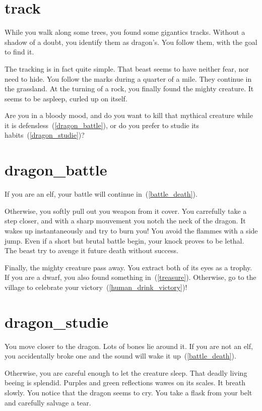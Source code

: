 \section{track}

While you walk along some trees, you found some gigantics tracks. Without a
shadow of a doubt, you identify them as dragon's. You follow them, with
the goal to find it.

The tracking is in fact quite simple. That beast seems to have neither fear, nor
need to hide. You follow the marks during a quarter of a mile. They continue in
the grassland. At the turning of a rock, you finally found the mighty creature.
It seems to be aspleep, curled up on itself.

Are you in a bloody mood, and do you want to kill that mythical creature while it
is defensless~(\ref{dragon_battle}), or do you prefer to studie its
habits~(\ref{dragon_studie})?

\section{dragon_battle}

If you are an elf, your battle will continue in~(\ref{battle_death}).

\medbreak

Otherwise, you softly pull out you weapon from it cover. You carrefully take a
step closer, and with a sharp mouvement you notch the neck of the dragon. It wakes
up instantaneously and try to burn you! You avoid the flammes with a side jump.
Even if a short but brutal battle begin, your knock proves to be lethal. The
beast try to avenge it future death without success.

Finally, the mighty creature pass away. You extract both of its eyes as a
trophy. If you are a dwarf, you also found something in~(\ref{treasure}).
Otherwise, go to the village to celebrate your
victory~(\ref{human_drink_victory})!

\section{dragon_studie}

You move closer to the dragon. Lots of bones lie around it. If you are not an
elf, you accidentally broke one and the sound will wake it
up~(\ref{battle_death}).

\medbreak

Otherwise, you are careful enough to let the creature sleep. That deadly living
beeing is splendid. Purples and green reflections wawes on its scales. It breath
slowly. You notice that the dragon seems to cry. You take a flask from your belt
and carefully salvage a tear.

